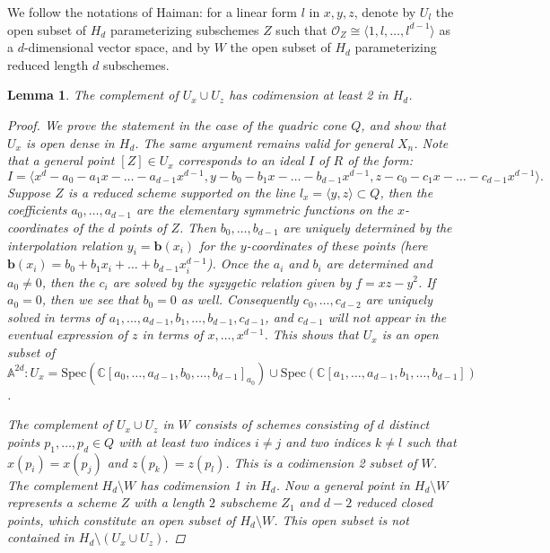 \documentclass{amsart}[12pt]
\newtheorem{lemma}[theorem]{Lemma}
\theoremstyle{definition}
\theoremstyle{remark}
\numberwithin{equation}{section}
\begin{document}
We follow the notations of Haiman: for a linear form $l$ in $x, y, z$, denote by $U_l$ the open subset of $H_d$ parameterizing subschemes $Z$ such that $\mathcal{O}_Z \cong \langle 1, l, \dots, l^{d - 1}\rangle$ as a $d$-dimensional vector space, and by $W$ the open subset of $H_d$ parameterizing reduced length $d$ subschemes.

\begin{lemma}\label{openset}
The complement of $U_x \cup U_z$ has codimension at least 2 in $H_d$.
\begin{proof}
We prove the statement in the case of the quadric cone $Q$, and show that $U_x$ is open dense in $H_d$. The same argument remains valid for general $X_n$. Note that a general point $[Z] \in U_x$ corresponds to an ideal $I$ of $R$ of the form: 
\[
I = \langle x^d - a_0 - a_1x - \dots - a_{d - 1}x^{d - 1}, y - b_0 - b_1x - \dots - b_{d - 1}x^{d - 1},  z - c_0 - c_1x - \dots - c_{d - 1}x^{d - 1} \rangle.
\]
Suppose $Z$ is a reduced scheme supported on the line $l_x = \langle y, z \rangle \subset Q$, then the coefficients $a_0, \dots, a_{d - 1}$ are the elementary symmetric functions on the $x$-coordinates of the $d$ points of $Z$. Then $b_0, \dots, b_{d - 1}$ are uniquely determined by the interpolation relation $y_i = \mathbf{b}(x_i)$ for the $y$-coordinates of these points (here $\mathbf{b}(x_i) = b_0 + b_1x_i + \dots + b_{d - 1}x_i^{d - 1}$). Once the $a_i$ and $b_i$ are determined and $a_0 \neq 0$, then the $c_i$ are solved by the syzygetic relation given by $f = xz - y^2$. If $a_0 = 0$, then we see that $b_0 = 0$ as well. Consequently $c_0, \dots, c_{d - 2}$ are uniquely solved in terms of $a_1, \dots, a_{d -1}, b_1, \dots, b_{d - 1}, c_{d - 1}$, and $c_{d - 1}$ will not appear in the eventual expression of $z$ in terms of $x, \dots, x^{d - 1}$. This shows that $U_x$ is an open subset of $\mathbb{A}^{2d}: U_x = \mathrm{Spec}(\mathbb{C}[a_0, \dots, a_{d - 1}, b_0, \dots, b_{d - 1}]_{a_0}) \cup \mathrm{Spec}(\mathbb{C}[a_1, \dots, a_{d - 1}, b_1, \dots, b_{d - 1}])$.

The complement of $U_x \cup U_z$ in $W$ consists of schemes consisting of $d$ distinct points $p_1, \dots, p_d \in Q$ with at least two indices $i \neq j$ and two indices $k \neq l$ such that $x(p_i) = x(p_j)$ and $z(p_k) = z(p_l)$. This is a codimension 2 subset of $W$. The complement $H_d \setminus W$ has codimension 1 in $H_d$. Now a general point in $H_d \setminus W$ represents a scheme $Z$ with a length $2$ subscheme $Z_1$ and $d - 2$ reduced closed points, which constitute an open subset of $H_d \setminus W$. This open subset is not contained in $H_d \setminus (U_x \cup U_z)$. 
\end{proof}
\end{lemma} 
\end{document}
